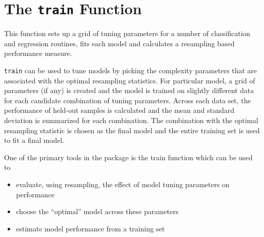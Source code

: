 \documentclass[caret-main.tex]{subfiles}
\begin{document}
\section{The \texttt{train} Function}
This function sets up a grid of tuning parameters for a number of classification and regression routines, fits each model and calculates a resampling based performance measure.


\texttt{train} can be used to tune models by picking the complexity parameters that are associated with the optimal resampling statistics. For particular model, a grid of parameters (if any) is created and the model is trained on slightly different data for each candidate combination of tuning parameters. Across each data set, the performance of held-out samples is calculated and the mean and standard deviation is summarized for each combination. The combination with the optimal resampling statistic is chosen as the final model and the entire training set is used to fit a final model.



One of the primary tools in the package is the train function which can be used to

\begin{itemize}
\item evaluate, using resampling, the eﬀect of model tuning parameters on performance
\item choose the “optimal” model across these parameters
\item estimate model performance from a training set
\end{itemize}
\end{document}
